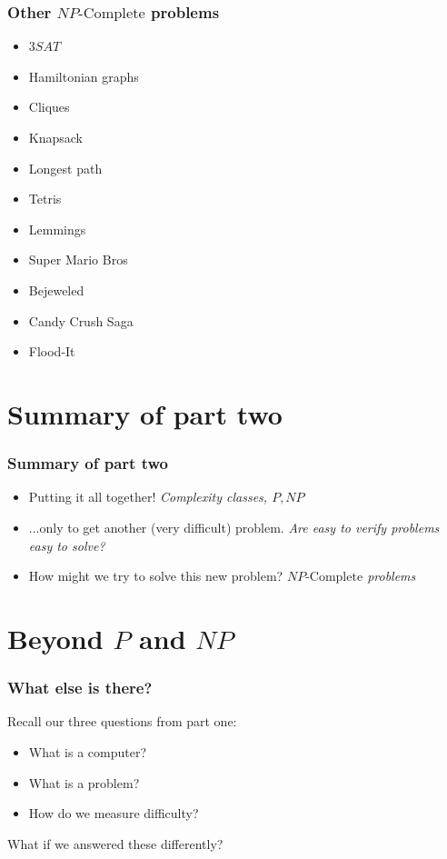 \documentclass[aspectratio=169]{beamer}
\begin{document}
\begin{frame}
\frametitle{Other $NP\text{-Complete}$ problems}
\begin{itemize}
	\item<1-> $3SAT$
	\item<2-> Hamiltonian graphs
	\item<3-> Cliques
	\item<4-> Knapsack
	\item<5-> Longest path
	\item<6-> Tetris
	\item<7-> Lemmings
	\item<8-> Super Mario Bros
	\item<9-> Bejeweled
	\item<10-> Candy Crush Saga
	\item<11-> Flood-It
\end{itemize}
\end{frame}

\section{Summary of part two}

\begin{frame}
\frametitle{Summary of part two}
\begin{itemize}
    \item Putting it all together! {\em Complexity classes, $P, NP$}
    \item ...only to get another (very difficult) problem. {\em Are easy to verify problems easy to solve?}
    \item How might we try to solve this new problem? {\em $NP\text{-Complete}$ problems}
\end{itemize}
\end{frame}

\section{Beyond $P$ and $NP$}

\begin{frame}
\frametitle{What else is there?}
Recall our three questions from part one:
\begin{itemize}
    \item What is a computer?
    \item What is a problem?
    \item How do we measure difficulty?
\end{itemize}
What if we answered these differently?
\end{frame}
\end{document}
